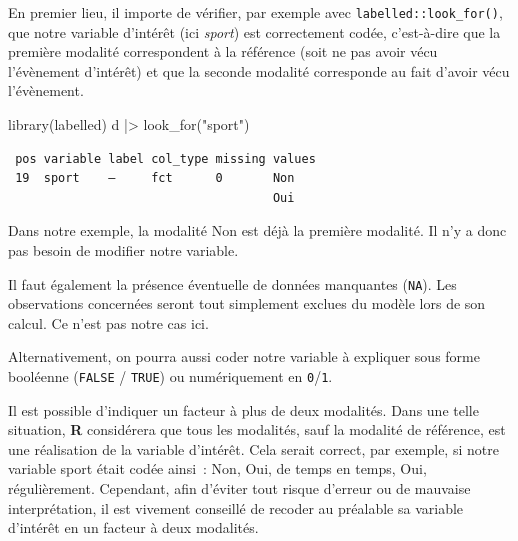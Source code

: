 \documentclass[
  letterpaper,
  DIV=11,
  numbers=noendperiod,
  oneside]{scrreprt}
\newenvironment{Shaded}{\begin{snugshade}}{\end{snugshade}}
\newcommand{\FunctionTok}[1]{\textcolor[rgb]{0.28,0.35,0.67}{#1}}
\newcommand{\NormalTok}[1]{\textcolor[rgb]{0.00,0.23,0.31}{#1}}
\newcommand{\SpecialCharTok}[1]{\textcolor[rgb]{0.37,0.37,0.37}{#1}}
\newcommand{\StringTok}[1]{\textcolor[rgb]{0.13,0.47,0.30}{#1}}
\begin{document}
En premier lieu, il importe de vérifier, par exemple avec
\texttt{labelled::look\_for()}, que notre variable d'intérêt (ici
\emph{sport}) est correctement codée, c'est-à-dire que la première
modalité correspondent à la référence (soit ne pas avoir vécu
l'évènement d'intérêt) et que la seconde modalité corresponde au fait
d'avoir vécu l'évènement.

\begin{Shaded}
\begin{Highlighting}[]
\FunctionTok{library}\NormalTok{(labelled)}
\NormalTok{d }\SpecialCharTok{|\textgreater{}} \FunctionTok{look\_for}\NormalTok{(}\StringTok{"sport"}\NormalTok{)}
\end{Highlighting}
\end{Shaded}

\begin{verbatim}
 pos variable label col_type missing values
 19  sport    —     fct      0       Non   
                                     Oui   
\end{verbatim}

Dans notre exemple, la modalité Non est déjà la première modalité. Il
n'y a donc pas besoin de modifier notre variable.

Il faut également la présence éventuelle de données manquantes
(\texttt{NA}). Les observations
concernées seront tout simplement exclues du modèle lors de son calcul.
Ce n'est pas notre cas ici.

\begin{tcolorbox}[enhanced jigsaw, colbacktitle=quarto-callout-tip-color!10!white, opacityback=0, toprule=.15mm, colback=white, coltitle=black, bottomtitle=1mm, toptitle=1mm, titlerule=0mm, rightrule=.15mm, title=\textcolor{quarto-callout-tip-color}{\faLightbulb}\hspace{0.5em}{Astuce}, breakable, bottomrule=.15mm, opacitybacktitle=0.6, arc=.35mm, left=2mm, leftrule=.75mm, colframe=quarto-callout-tip-color-frame]

Alternativement, on pourra aussi coder notre variable à expliquer sous
forme booléenne (\texttt{FALSE} / \texttt{TRUE}) ou numériquement en
\texttt{0}/\texttt{1}.

Il est possible d'indiquer un facteur à plus de deux modalités. Dans une
telle situation, \textbf{R} considérera que tous les modalités, sauf la
modalité de référence, est une réalisation de la variable d'intérêt.
Cela serait correct, par exemple, si notre variable sport était codée
ainsi~: Non, Oui, de temps en temps, Oui, régulièrement. Cependant, afin
d'éviter tout risque d'erreur ou de mauvaise interprétation, il est
vivement conseillé de recoder au préalable sa variable d'intérêt en un
facteur à deux modalités.

\end{tcolorbox}
\end{document}
